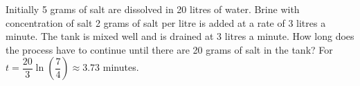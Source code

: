 {Initially 5 grams of salt are dissolved in 20 litres of water.  Brine
with concentration of salt 2 grams of salt per litre is added at a rate
of 3 litres a minute.  The tank is mixed well and is drained at 3 litres
a minute.  How long does the process have to continue until there are 20 grams
of salt in the tank?}
{For $t=\dfrac{20}{3}\ln\left(\dfrac{7}{4}\right) \approx 3.73$ minutes.}